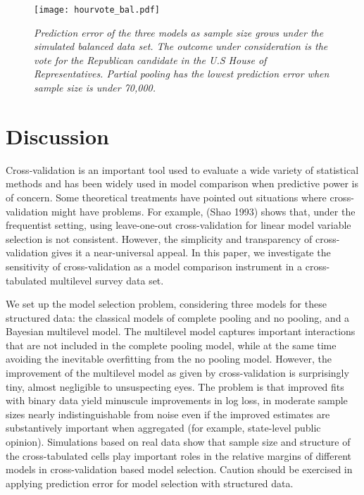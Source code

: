 \begin{figure}[p!]
  \centering
  \texttt{[image: hourvote\_bal.pdf]}
  \caption{\em Prediction error of the three models as sample size grows under the
    simulated balanced data set. The outcome under consideration is the vote for
    the Republican candidate in the U.S House of Representatives. Partial
    pooling has the lowest prediction error when sample size is under 70,000.}
  \label{fig:hourvote_bal}
\end{figure}

\section{Discussion}\label{discussion}

Cross-validation is an important tool used to evaluate a wide variety of
statistical methods and has been widely used in model comparison when
predictive power is of concern. Some theoretical treatments have pointed
out situations where cross-validation might have problems. For example,
(Shao 1993) shows that, under the frequentist setting, using
leave-one-out cross-validation for linear model variable selection is
not consistent. However, the simplicity and transparency of
cross-validation gives it a near-universal appeal. In this paper, we
investigate the sensitivity of cross-validation as a model comparison
instrument in a cross-tabulated multilevel survey data set.

We set up the model selection problem, considering three models for
these structured data: the classical models of complete pooling and no
pooling, and a Bayesian multilevel model. The multilevel model captures
important interactions that are not included in the complete pooling
model, while at the same time avoiding the inevitable overfitting from
the no pooling model. However, the improvement of the multilevel model
as given by cross-validation is surprisingly tiny, almost negligible to
unsuspecting eyes. The problem is that improved fits with binary data
yield minuscule improvements in log loss, in moderate sample sizes
nearly indistinguishable from noise even if the improved estimates are
substantively important when aggregated (for example, state-level public
opinion). Simulations based on real data show that sample size and
structure of the cross-tabulated cells play important roles in the
relative margins of different models in cross-validation based model
selection. Caution should be exercised in applying prediction error for
model selection with structured data.

